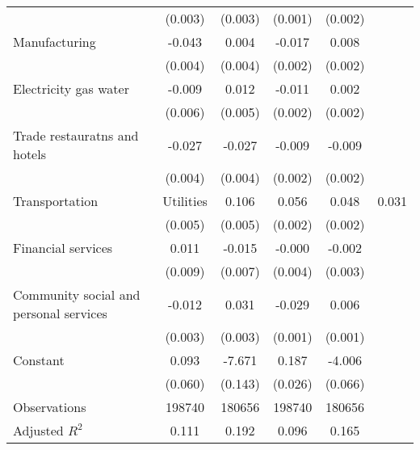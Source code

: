\begin{table}[htbp]
\begin{tabular}{l*{4}{c}}
                    &     (0.003)         &     (0.003)         &     (0.001)         &     (0.002)         \\
Manufacturing       &      -0.043\sym{***}&       0.004         &      -0.017\sym{***}&       0.008\sym{***}\\
                    &     (0.004)         &     (0.004)         &     (0.002)         &     (0.002)         \\
Electricity gas water&      -0.009         &       0.012\sym{*}  &      -0.011\sym{***}&       0.002         \\
                    &     (0.006)         &     (0.005)         &     (0.002)         &     (0.002)         \\
Trade restauratns and hotels&      -0.027\sym{***}&      -0.027\sym{***}&      -0.009\sym{***}&      -0.009\sym{***}\\
                    &     (0.004)         &     (0.004)         &     (0.002)         &     (0.002)         \\
Transportation & Utilities&       0.106\sym{***}&       0.056\sym{***}&       0.048\sym{***}&       0.031\sym{***}\\
                    &     (0.005)         &     (0.005)         &     (0.002)         &     (0.002)         \\
Financial services  &       0.011         &      -0.015\sym{*}  &      -0.000         &      -0.002         \\
                    &     (0.009)         &     (0.007)         &     (0.004)         &     (0.003)         \\
Community social and personal services&      -0.012\sym{***}&       0.031\sym{***}&      -0.029\sym{***}&       0.006\sym{***}\\
                    &     (0.003)         &     (0.003)         &     (0.001)         &     (0.001)         \\
Constant            &       0.093         &      -7.671\sym{***}&       0.187\sym{***}&      -4.006\sym{***}\\
                    &     (0.060)         &     (0.143)         &     (0.026)         &     (0.066)         \\
\hline
Observations        &      198740         &      180656         &      198740         &      180656         \\
Adjusted \(R^{2}\)  &       0.111         &       0.192         &       0.096         &       0.165         \\
\hline\hline
\end{tabular}
\end{table}
